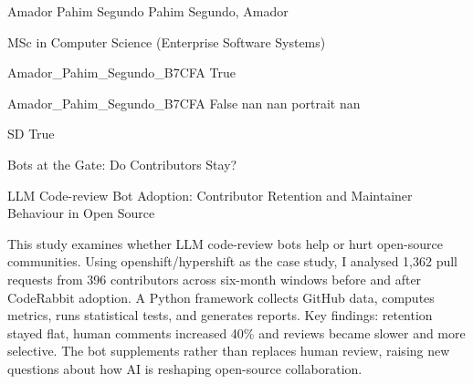 
\begingroup{}\relax



\def\Key{Amador_Pahim_Segundo_B7CFA}

{Amador Pahim Segundo}
{Pahim Segundo, Amador}

{MSc in Computer Science (Enterprise Software Systems)}

{Amador_Pahim_Segundo_B7CFA}
{True}

{Amador_Pahim_Segundo_B7CFA}
{False}
{nan}
{nan}
{portrait}
{nan}

{SD}
{True}

{Bots at the Gate: Do Contributors Stay?}

{LLM Code-review Bot Adoption: Contributor Retention and Maintainer Behaviour in Open Source}

{This study examines whether LLM code-review bots help or hurt open-source communities. Using openshift/hypershift as the case study, I analysed 1,362 pull requests from 396 contributors across six-month windows before and after CodeRabbit adoption. A Python framework collects GitHub data, computes metrics, runs statistical tests, and generates reports. Key findings: retention stayed flat, human comments increased 40\% and reviews became slower and more selective. The bot supplements rather than replaces human review, raising new questions about how AI is reshaping open-source collaboration.}

